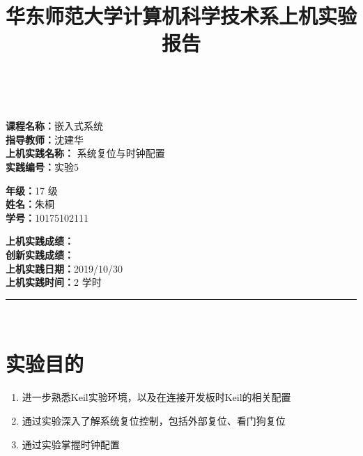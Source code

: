 \documentclass[a4paper,10pt,UTF8]{paper}
\title{华东师范大学计算机科学技术系上机实验报告}
\numberwithin{equation}{section}
\numberwithin{figure}{section}
\begin{document}
\pagestyle{fancy}
\lhead{}
\rhead{}
\makeatletter
\def\headrule{{\if@fancyplain\let\headrulewidth\plainheadrulewidth\fi%
\color{gray}\hrule\@height 0.2pt\@width\headwidth}
  \vspace{6mm}}
\makeatother


\newcommand{\HRule}{\rule{\linewidth}{1mm}}
\newcommand{\dai}{\textbf{Dais-CMX16$^+$}}

{ \\ [0.8cm]

\small{
  \begin{minipage}[t]{.32\linewidth}
    \textbf{课程名称：}嵌入式系统\\
    \textbf{指导教师：}沈建华\\
    \textbf{上机实践名称：} 系统复位与时钟配置\\
    \textbf{实践编号：}实验5
  \end{minipage}
  \begin{minipage}[t]{.32\linewidth}
    \textbf{年级：}17 级\\
    \textbf{姓名：}朱桐\\
    \textbf{学号：}10175102111\\
  \end{minipage} 
  \begin{minipage}[t]{.32\linewidth}
    \textbf{上机实践成绩：} \\
    \textbf{创新实践成绩：} \\
    \textbf{上机实践日期：}2019/10/30\\
    \textbf{上机实践时间：}2 学时\\
  \end{minipage}
}
\HRule \\[0.5cm]
}


\section{实验目的}

\begin{enumerate}
    \item 进一步熟悉Keil实验环境，以及在连接开发板时Keil的相关配置
    \item 通过实验深入了解系统复位控制，包括外部复位、看门狗复位
    \item 通过实验掌握时钟配置
\end{enumerate}
\end{document}

